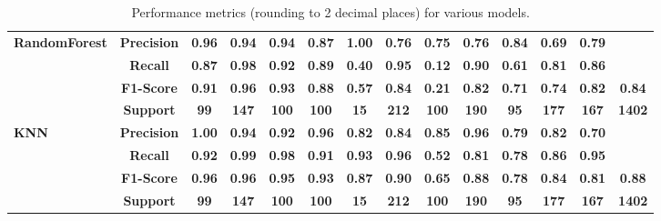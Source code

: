 \begin{table}[h]
{\begin{tabular}{lccccccccccccc}
         \textbf{RandomForest} & \textbf{Precision} & \textbf{0.96} & \textbf{0.94} & \textbf{0.94} & \textbf{0.87} & \textbf{1.00} & \textbf{0.76} & \textbf{0.75} & \textbf{0.76} & \textbf{0.84} & \textbf{0.69} & \textbf{0.79} & \textbf{}\\
        \textbf{} & \textbf{Recall} & \textbf{0.87} & \textbf{0.98} & \textbf{0.92} & \textbf{0.89} & \textbf{0.40} & \textbf{0.95} & \textbf{0.12} & \textbf{0.90} & \textbf{0.61} & \textbf{0.81} & \textbf{0.86} & \textbf{}\\
        \textbf{} & \textbf{F1-Score} & \textbf{0.91} & \textbf{0.96} & \textbf{0.93} & \textbf{0.88} & \textbf{0.57} & \textbf{0.84} & \textbf{0.21} & \textbf{0.82} & \textbf{0.71} & \textbf{0.74} & \textbf{0.82} & \textbf{0.84}\\
        \textbf{} & \textbf{Support} & \textbf{99} & \textbf{147} & \textbf{100} & \textbf{100} & \textbf{15} & \textbf{212} & \textbf{100} & \textbf{190} & \textbf{95} & \textbf{177} & \textbf{167} & \textbf{1402}\\

        \midrule

        \textbf{KNN} & \textbf{Precision} & \textbf{1.00} & \textbf{0.94} & \textbf{0.92} & \textbf{0.96} & \textbf{0.82} & \textbf{0.84} & \textbf{0.85} & \textbf{0.96} & \textbf{0.79} & \textbf{0.82} & \textbf{0.70} & \textbf{}\\
        \textbf{} & \textbf{Recall} & \textbf{0.92} & \textbf{0.99} & \textbf{0.98} & \textbf{0.91} & \textbf{0.93} & \textbf{0.96} & \textbf{0.52} & \textbf{0.81} & \textbf{0.78} & \textbf{0.86} & \textbf{0.95} & \textbf{}\\
        \textbf{} & \textbf{F1-Score} & \textbf{0.96} & \textbf{0.96} & \textbf{0.95} & \textbf{0.93} & \textbf{0.87} & \textbf{0.90} & \textbf{0.65} & \textbf{0.88} & \textbf{0.78} & \textbf{0.84} & \textbf{0.81} & \textbf{0.88}\\
        \textbf{} & \textbf{Support} & \textbf{99} & \textbf{147} & \textbf{100} & \textbf{100} & \textbf{15} & \textbf{212} & \textbf{100} & \textbf{190} & \textbf{95} & \textbf{177} & \textbf{167} & \textbf{1402}\\

        \bottomrule
    \end{tabular}%
    }
    \caption{Performance metrics (rounding to 2 decimal places) for various models.}
    \label{tab:performance_metrics}
\end{table}

\restoregeometry



